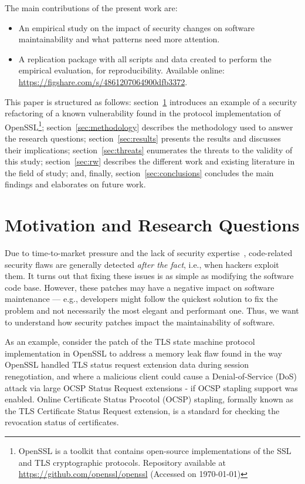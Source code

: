 \documentclass[10pt,conference]{IEEEtran}
\makeatletter
\newcommand\footnoteref[1]{\protected@xdef\@thefnmark{\ref{#1}}\@footnotemark}
\makeatother
\begin{document}
The main contributions of the present work are:
%
\begin{itemize}
	\item An empirical study on the impact of security changes on software
	maintainability and what patterns need more attention.
	\item A replication package with all scripts and data created to perform the
	empirical evaluation, for reproducibility. Available online:
  \url{https://figshare.com/s/4861207064900dfb3372}.
\end{itemize}
This paper is structured as follows: section~\ref{sec:motivation} introduces an
example of a security refactoring of a known vulnerability found in the
protocol implementation of OpenSSL\footnote{\label{openssl}OpenSSL is a toolkit that
contains open-source implementations of the SSL and TLS cryptographic
protocols. Repository available at \url{https://github.com/openssl/openssl}
(Accessed on \today{})}; section~\ref{sec:methodology} describes the
methodology used to answer the research questions; section~\ref{sec:results}
presents the results and discusses their
implications; section~\ref{sec:threats} enumerates the threats to the validity of
this study; section~\ref{sec:rw} describes the different work and existing
literature in the field of study; and, finally, section~\ref{sec:conclusions}
concludes the main findings and elaborates on future work.
%

\section{Motivation and Research Questions}\label{sec:motivation}
%
Due to time-to-market pressure and the lack of security expertise~\cite{8077802}, code-related
security flaws are generally detected \textit{after the fact}, i.e., when
hackers exploit them. It turns out that fixing these issues is as simple as
modifying the software code base. However, these patches may have a
negative impact on software maintenance --- e.g., developers might follow the
quickest solution to fix the problem and not necessarily the most elegant and
performant one. Thus, we want to understand how security patches impact
the maintainability of software. 

As an example, consider the patch of the TLS state machine protocol implementation
in OpenSSL\footnoteref{openssl} to address a memory leak flaw found in the way 
OpenSSL handled TLS status request extension data during session 
renegotiation, and where a malicious client could cause a Denial-of-Service
(DoS) attack via large OCSP Status Request extensions - if OCSP stapling support
was enabled. Online Certificate Status Procotol (OCSP) stapling, formally known as the TLS Certificate 
Status Request extension, is a standard for checking the revocation status of
certificates. 
\end{document}
